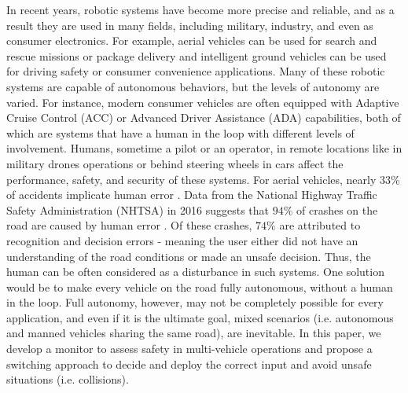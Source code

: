 \documentclass[letterpaper, 10 pt, conference]{ieeeconf}  %
\newcommand\NB[1]{$\spadesuit$\footnote{NB: #1}}
\begin{document}

In recent years, robotic systems have become more precise and reliable, and as a result they are used in many fields, including military, industry, and even as consumer electronics. For example, aerial vehicles can be used for search and rescue missions or package delivery and intelligent ground vehicles can be used for driving safety or consumer convenience applications. Many of these robotic systems are capable of autonomous behaviors, but the levels of autonomy are varied. For instance, modern consumer vehicles are often equipped with Adaptive Cruise Control (ACC)\cite{acc} or Advanced Driver Assistance (ADA)\cite{adas} capabilities, both of which are systems that have a human in the loop with different levels of involvement. Humans, sometime a pilot or an operator, in remote locations like in military drones operations or behind steering wheels in cars affect the performance, safety, and security of these systems. For aerial vehicles, nearly 33\% of accidents implicate human error \cite{aviacc}. Data from the National Highway Traffic Safety Administration (NHTSA) in 2016 suggests that $94\%$ of crashes on the road are caused by human error \cite{nhtsa}. Of these crashes, $74\%$ are attributed to recognition and decision errors - meaning the user either did not have an understanding of the road conditions or made an unsafe decision. Thus, the human can be often considered as a disturbance in such systems. One solution would be to make every vehicle on the road fully autonomous, without a human in the loop. Full autonomy, however, may not be completely possible for every application, and even if it is the ultimate goal, mixed scenarios (i.e. autonomous and manned vehicles sharing the same road), are inevitable. In this paper, we develop a monitor to assess safety in multi-vehicle operations and propose a switching approach to decide and deploy the correct input and avoid unsafe situations (i.e. collisions).
\end{document}
